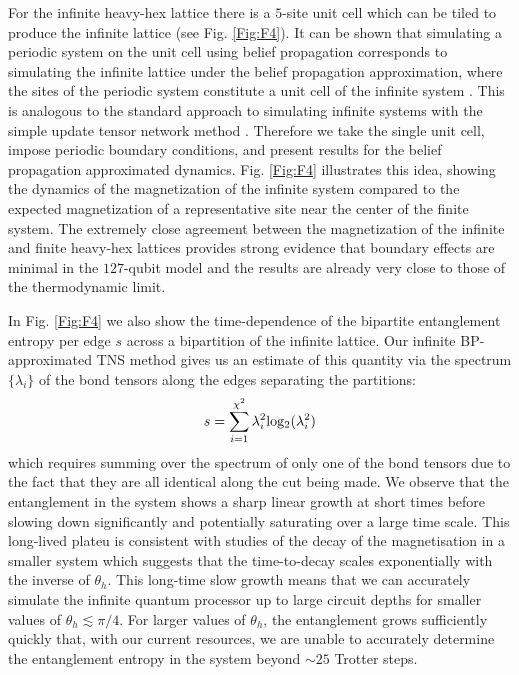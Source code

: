\documentclass[%
 superscriptaddress,
 amsmath,amssymb,
 prx, nofootinbib,
 twocolumn
]{revtex4-2}
\begin{document}
For the infinite heavy-hex lattice there is a $5$-site unit cell which can be tiled to produce the infinite lattice (see Fig. \ref{Fig:F4}). 
It can be shown that simulating a periodic system on the unit cell using belief propagation corresponds to simulating the infinite lattice under the belief propagation approximation, where the sites of the periodic system constitute a unit cell of the infinite system \cite{TindallGauging2023}.
This is analogous to the standard approach to simulating infinite systems with the simple update tensor network method \cite{Jiang2008}. 
Therefore we take the single unit cell, impose periodic boundary conditions, and present results for the belief propagation approximated dynamics.
Fig. \ref{Fig:F4} illustrates this idea, showing the dynamics of the magnetization of the infinite system compared to the expected magnetization of a representative site near the center of the finite system. The extremely close agreement between the magnetization of the infinite and finite heavy-hex lattices provides strong evidence that boundary effects are minimal in the $127$-qubit model and the results are already very close to those of the thermodynamic limit. 

In Fig. \ref{Fig:F4} we also show the time-dependence of the bipartite entanglement entropy per edge $s$ across a bipartition of the infinite lattice. Our infinite BP-approximated TNS method gives us an estimate of this quantity via the spectrum $\{\lambda_{i}\}$ of the bond tensors along the edges separating the partitions:
\begin{equation}
    s = \sum_{i=1}^{\chi^{2}}\lambda_{i}^{2}{\rm log_{2}}(\lambda_{i}^{2})
    \label{Eq:EntanglementEntropy}
\end{equation}
which requires summing over the spectrum of only one of the bond tensors due to the fact that they are all identical along the cut being made. We observe that the entanglement in the system shows a sharp linear growth at short times before slowing down significantly and potentially saturating over a large time scale. This long-lived plateu is consistent with studies of the decay of the magnetisation in a smaller system \cite{kechedzhi2023} which suggests that the time-to-decay scales exponentially with the inverse of $\theta_{h}$.
This long-time slow growth means that we can accurately simulate the infinite quantum processor up to large circuit depths for smaller values of $\theta_{h} \lesssim \pi/4$. For larger values of $\theta_{h}$, the entanglement grows sufficiently quickly that, with our current resources, we are unable to accurately determine the entanglement entropy in the system beyond $\sim 25$ Trotter steps.
\end{document}
